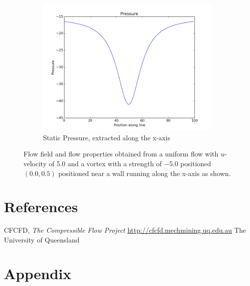 \documentclass[10pt,a4paper]{article}
\begin{document}
\begin{figure}
\begin{subfigure}{0.48\textwidth}
    \includegraphics[width=1.0\textwidth]{Figures/Vortex_wall_P_wall}
  \caption{Static Pressure, extracted along the x-axis}
\end{subfigure}
\hfill
\caption{Flow field and flow properties obtained from a uniform flow with $u$-velocity of \num{5.0} and a vortex with a strength of \num{-5.0} positioned $(0.0, 0.5)$ positioned near a wall running along the x-axis as shown.}
\label{F_vortex_wall_results}
\end{figure}




\clearpage
\section{References}

\begin{thebibliography}{9}
CFCFD,
\emph{The Compressible Flow Project}
\url{http://cfcfd.mechmining.uq.edu.au}
The University of Queensland

\end{thebibliography}

\section{Appendix}


\end{document}
